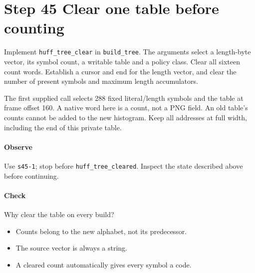 \section{Step 45 Clear one table before counting}\label{png-huff-s45}
Implement \texttt{huff\_tree\_clear} in \texttt{build\_tree}. The arguments select a length-byte vector, its symbol count, a writable table and a policy class. Clear all sixteen count words. Establish a cursor and end for the length vector, and clear the number of present symbols and maximum length accumulators.

The first supplied call selects 288 fixed literal/length symbols and the table at frame offset 160. A native word here is a count, not a PNG field. An old table's counts cannot be added to the new histogram. Keep all addresses at full width, including the end of this private table.

\paragraph{Observe} Use \texttt{s45-1}; stop before \texttt{huff\_tree\_cleared}. Inspect the state described above before continuing.

\paragraph{Check} Why clear the table on every build?
\begin{itemize}
\item[A.] Counts belong to the new alphabet, not its predecessor.
\item[B.] The source vector is always a string.
\item[C.] A cleared count automatically gives every symbol a code.
\end{itemize}
